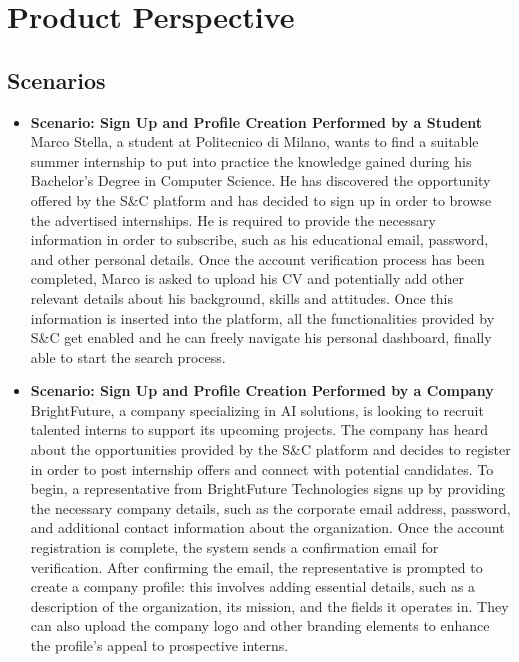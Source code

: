 \section{Product Perspective}
\label{sec:product_Perspective}

\subsection{Scenarios}
\label{subsec:scenarios}

\setcounter{scenario}{1}
\newcommand{\incscenario} {\stepcounter{scenario}}

\begin{itemize}
    \item \textbf{\nth{\thescenario} Scenario: Sign Up and Profile Creation Performed by a Student}
    \\
        Marco Stella, a student at Politecnico di Milano, wants to find a suitable summer internship to put into practice the knowledge gained during his Bachelor's Degree in Computer Science. 
        He has discovered the opportunity offered by the S\&C platform and has decided to sign up in order to browse the advertised internships. He is required to provide the necessary information in order to subscribe, such as his educational email, password, and other personal details. Once the account verification process has been completed, Marco is asked to upload his CV and potentially add other relevant details about his background, skills and attitudes.
        Once this information is inserted into the platform, all the functionalities provided by S\&C get enabled and he can freely navigate his personal dashboard, finally able to start the search process.
        \incscenario
    \item \textbf{\nth{\thescenario} Scenario: Sign Up and Profile Creation Performed by a Company}
    \\
        BrightFuture, a company specializing in AI solutions, is looking to recruit talented interns to support its upcoming projects. The company has heard about the opportunities provided by the S\&C platform and decides to register in order to post internship offers and connect with potential candidates.
        To begin, a representative from BrightFuture Technologies signs up by providing the necessary company details, such as the corporate email address, password, and additional contact information about the organization. Once the account registration is complete, the system sends a confirmation email for verification. After confirming the email, the representative is prompted to create a company profile: this involves adding essential details, such as a description of the organization, its mission, and the fields it operates in. They can also upload the company logo and other branding elements to enhance the profile’s appeal to prospective interns.

\end{itemize}
